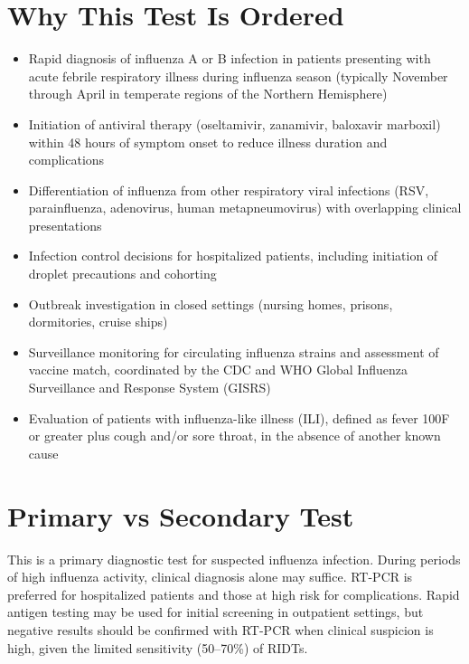 \section*{Why This Test Is Ordered}
\begin{itemize}
  \item Rapid diagnosis of influenza A or B infection in patients presenting with acute febrile respiratory illness during influenza season (typically November through April in temperate regions of the Northern Hemisphere)
  \item Initiation of antiviral therapy (oseltamivir, zanamivir, baloxavir marboxil) within 48 hours of symptom onset to reduce illness duration and complications \cite{uyeki2019clinical}
  \item Differentiation of influenza from other respiratory viral infections (RSV, parainfluenza, adenovirus, human metapneumovirus) with overlapping clinical presentations
  \item Infection control decisions for hospitalized patients, including initiation of droplet precautions and cohorting
  \item Outbreak investigation in closed settings (nursing homes, prisons, dormitories, cruise ships)
  \item Surveillance monitoring for circulating influenza strains and assessment of vaccine match, coordinated by the CDC and WHO Global Influenza Surveillance and Response System (GISRS) \cite{cdc2022influenza}
  \item Evaluation of patients with influenza-like illness (ILI), defined as fever 100\textdegree{}F or greater plus cough and/or sore throat, in the absence of another known cause
\end{itemize}

\section*{Primary vs Secondary Test}
This is a primary diagnostic test for suspected influenza infection. During periods of high influenza activity, clinical diagnosis alone may suffice. RT-PCR is preferred for hospitalized patients and those at high risk for complications. Rapid antigen testing may be used for initial screening in outpatient settings, but negative results should be confirmed with RT-PCR when clinical suspicion is high, given the limited sensitivity (50--70\%) of RIDTs.

